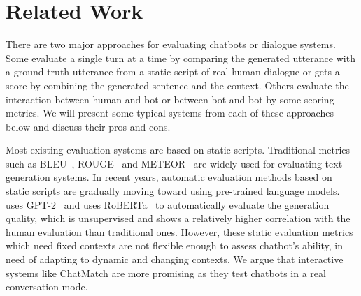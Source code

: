 \section{Related Work}

There are two major approaches for evaluating chatbots or dialogue systems. Some evaluate a single turn at a time by comparing the generated utterance with a ground truth utterance from a static script of real human dialogue or gets a score by combining the generated sentence and the context. Others evaluate the interaction between human and bot or between bot and bot by some scoring metrics. We will present some typical systems from each of these approaches below and discuss their pros and cons. 



Most existing evaluation systems are based on static scripts. 
Traditional metrics such as BLEU~\citep{bleu}, ROUGE~\citep{lin-2004-rouge} 
and METEOR~\citep{banerjee-lavie-2005-meteor} are widely used 
for evaluating text generation systems.
In recent years,
automatic evaluation methods based on static scripts are gradually 
moving toward using pre-trained language models. 
\citet{pang-etal-2020-towards} uses GPT-2~\citep{gpt2} and
\citet{mehri-eskenazi-2020-usr} uses RoBERTa~\citep{roberta} to 
automatically evaluate the generation quality, which is unsupervised and shows a
relatively higher correlation with the human evaluation
than traditional ones. 
However, these static evaluation metrics which need fixed contexts are not 
flexible enough to assess chatbot's ability, in need of adapting to dynamic and changing
contexts. We argue that interactive systems like ChatMatch
are more promising as they test chatbots in a real conversation mode. 

